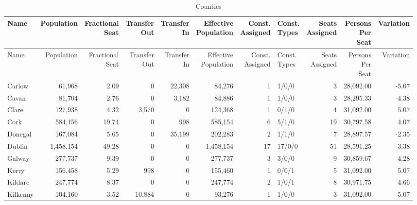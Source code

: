 \documentclass[a4paper]{article}
\begin{document}
\begin{longtable}{lrrrrrrlrrr}
\caption{Counties}
\\ \toprule
Name &Population &\shortstack{Fractional\\Seat} &\shortstack{Transfer\\Out} &\shortstack{Transfer\\In} &\shortstack{Effective\\Population} &\shortstack{Const.\\Assigned} &\shortstack{Const.\\Types} &\shortstack{Seats\\Assigned} &\shortstack{Persons\\Per\\Seat} &Variation \\ \midrule
\endfirsthead
\toprule
Name &Population &\shortstack{Fractional\\Seat} &\shortstack{Transfer\\Out} &\shortstack{Transfer\\In} &\shortstack{Effective\\Population} &\shortstack{Const.\\Assigned} &\shortstack{Const.\\Types} &\shortstack{Seats\\Assigned} &\shortstack{Persons\\Per\\Seat} &Variation \\ \midrule
\endhead
\bottomrule
\endfoot
Carlow&61,968& 2.09&0&22,308&84,276&1&1/0/0&3&28,092.00&-5.07\\ 
Cavan&81,704& 2.76&0&3,182&84,886&1&1/0/0&3&28,295.33&-4.38\\ 
Clare&127,938& 4.32&3,570&0&124,368&1&0/1/0&4&31,092.00& 5.07\\ 
Cork&584,156&19.74&0&998&585,154&6&5/1/0&19&30,797.58& 4.07\\ 
Donegal&167,084& 5.65&0&35,199&202,283&2&1/1/0&7&28,897.57&-2.35\\ 
Dublin&1,458,154&49.28&0&0&1,458,154&17&17/0/0&51&28,591.25&-3.38\\ 
Galway&277,737& 9.39&0&0&277,737&3&3/0/0&9&30,859.67& 4.28\\ 
Kerry&156,458& 5.29&998&0&155,460&1&0/0/1&5&31,092.00& 5.07\\ 
Kildare&247,774& 8.37&0&0&247,774&2&1/0/1&8&30,971.75& 4.66\\ 
Kilkenny&104,160& 3.52&10,884&0&93,276&1&1/0/0&3&31,092.00& 5.07\\ 

\end{longtable}
\end{document}
